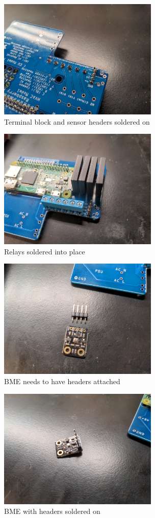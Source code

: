 \begin{figure}
  \centering
  \includegraphics[width=3in]{img/terminal_block_soldered.jpg}
  \caption{Terminal block and sensor headers soldered on}
  \label{fig:terminal_block_soldered}
\end{figure}
\begin{figure}
  \centering
  \includegraphics[width=3in]{img/relay_placement.jpg}
  \caption{Relays soldered into place}
  \label{fig:relays}
\end{figure}
\begin{figure}
  \centering
  \includegraphics[width=3in]{img/BME280.jpg}
  \caption{BME needs to have headers attached}
  \label{fig:BME}
\end{figure}
\begin{figure}
  \centering
  \includegraphics[width=3in]{img/BME280_assembled.jpg}
  \caption{BME with headers soldered on}
  \label{fig:BME_soldered}
\end{figure}
